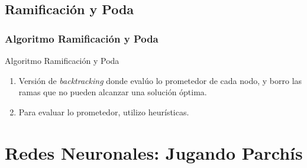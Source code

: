 \documentclass[a4paper,t,xcolor=pst,dvips,colortheme]{beamer}
\begin{document}
\subsection{Ramificación y Poda}

\begin{frame}[c]
    \frametitle{Algoritmo Ramificación y Poda}
    \begin{block}{Algoritmo Ramificación y Poda}
        \begin{enumerate}[<+->]
            \item Versión de \emph{backtracking} donde evalúo lo prometedor de cada nodo, y borro las ramas que no pueden alcanzar una solución óptima. 
            \item Para evaluar lo prometedor, utilizo heurísticas.
        \end{enumerate}
    \end{block}
\end{frame}


\section{Redes Neuronales: Jugando Parchís}


\end{document}
